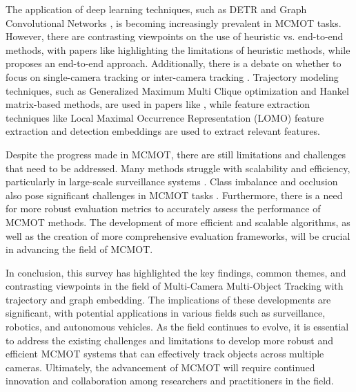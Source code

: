 \documentclass[conference]{IEEEtran}
\begin{document}
The application of deep learning techniques, such as DETR \cite{ArXivPaper3} and Graph Convolutional Networks \cite{ArXivPaper5}, is becoming increasingly prevalent in MCMOT tasks. However, there are contrasting viewpoints on the use of heuristic vs. end-to-end methods, with papers like \cite{ArXivPaper1} highlighting the limitations of heuristic methods, while \cite{ArXivPaper3} proposes an end-to-end approach. Additionally, there is a debate on whether to focus on single-camera tracking or inter-camera tracking \cite{ArXivPaper2, ArXivPaper4}. Trajectory modeling techniques, such as Generalized Maximum Multi Clique optimization and Hankel matrix-based methods, are used in papers like \cite{ArXivPaper2, ArXivPaper4, ArXivPaper5}, while feature extraction techniques like Local Maximal Occurrence Representation (LOMO) feature extraction \cite{ArXivPaper4} and detection embeddings \cite{ArXivPaper3} are used to extract relevant features.

Despite the progress made in MCMOT, there are still limitations and challenges that need to be addressed. Many methods struggle with scalability and efficiency, particularly in large-scale surveillance systems \cite{ArXivPaper1, ArXivPaper5}. Class imbalance and occlusion also pose significant challenges in MCMOT tasks \cite{ArXivPaper1, ArXivPaper3, ArXivPaper5}. Furthermore, there is a need for more robust evaluation metrics to accurately assess the performance of MCMOT methods. The development of more efficient and scalable algorithms, as well as the creation of more comprehensive evaluation frameworks, will be crucial in advancing the field of MCMOT.

In conclusion, this survey has highlighted the key findings, common themes, and contrasting viewpoints in the field of Multi-Camera Multi-Object Tracking with trajectory and graph embedding. The implications of these developments are significant, with potential applications in various fields such as surveillance, robotics, and autonomous vehicles. As the field continues to evolve, it is essential to address the existing challenges and limitations to develop more robust and efficient MCMOT systems that can effectively track objects across multiple cameras. Ultimately, the advancement of MCMOT will require continued innovation and collaboration among researchers and practitioners in the field.
\end{document}

